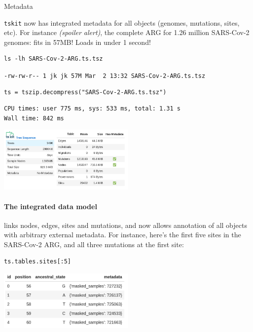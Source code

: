 \documentclass[landscape,a0paper,fontscale=0.4]{baposter}
\newcommand{\tskit}{{\texttt{tskit}}}
\begin{document}
\begin{poster}
\begin{posterbox}[name=inout,column=0,span=1]{Metadata}

    \tskit{} now has integrated metadata
    for all objects (genomes, mutations, sites, etc).
    For instance \emph{(spoiler alert)},
    the complete ARG for 1.26 million SARS-Cov-2 genomes: fits in 57MB!
    Loads in under 1 second!

\begin{verbatim}
ls -lh SARS-Cov-2-ARG.ts.tsz
\end{verbatim}
{\scriptsize \verb|-rw-rw-r-- 1 jk jk 57M Mar  2 13:32 SARS-Cov-2-ARG.ts.tsz|}
\begin{verbatim}
ts = tszip.decompress("SARS-Cov-2-ARG.ts.tsz")
\end{verbatim}
{\scriptsize
\begin{verbatim}
CPU times: user 775 ms, sys: 533 ms, total: 1.31 s
Wall time: 842 ms
\end{verbatim}
}
\includegraphics[width=0.5\textwidth]{sc2_ts.png}

\paragraph{The integrated data model}
links nodes, edges, sites and mutations,
and now allows annotation of all objects with arbitrary external metadata.
For instance,
here's the first five sites in the SARS-Cov-2 ARG,
and all three mutations at the first site:

\begin{multicols}{2}
\begin{verbatim}
ts.tables.sites[:5]
\end{verbatim}
\includegraphics[width=0.5\textwidth]{sc2_sites}


\end{multicols}
\end{posterbox}
\end{poster}
\end{document}
